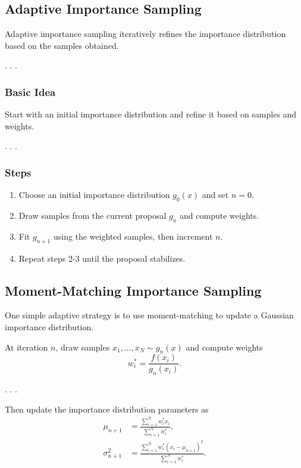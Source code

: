 \documentclass[
  letterpaper,
  DIV=11,
  numbers=noendperiod]{scrartcl}
\providecommand{\tightlist}{%
  \setlength{\itemsep}{0pt}\setlength{\parskip}{0pt}}
\begin{document}
\subsection{Adaptive Importance
Sampling}\label{adaptive-importance-sampling-1}

Adaptive importance sampling iteratively refines the importance
distribution based on the samples obtained.

. . .

\subsubsection{Basic Idea}\label{basic-idea-2}

Start with an initial importance distribution and refine it based on
samples and weights.

. . .

\subsubsection{Steps}\label{steps-1}

\begin{enumerate}
\def\labelenumi{\arabic{enumi}.}
\tightlist
\item
  Choose an initial importance distribution \(g_0(x)\) and set
  \(n = 0\).\pause
\item
  Draw samples from the current proposal \(g_n\) and compute
  weights.\pause
\item
  Fit \(g_{n+1}\) using the weighted samples, then increment \(n\).
  \pause
\item
  Repeat steps 2-3 until the proposal stabilizes.
\end{enumerate}

\subsection{Moment-Matching Importance
Sampling}\label{moment-matching-importance-sampling}

One simple adaptive strategy is to use moment-matching to update a
Gaussian importance distribution.

\medskip\pause

At iteration \(n\), draw samples \(x_1, \ldots, x_N \sim g_n(x)\) and
compute weights \[
  w_i^* = \frac{f(x_i)}{g_n(x_i)}.
\]

. . .

Then update the importance distribution parameters as \[
\begin{aligned}
  \mu_{n + 1}      &= \frac{\sum_{i=1}^N w_i^* x_i}{\sum_{i=1}^N w_i^*},\\
  \sigma^2_{n + 1} &= \frac{\sum_{i=1}^N w_i^* (x_i - \mu_{n + 1})^2}{\sum_{i=1}^N w_i^*}.
\end{aligned}
\]
\end{document}
